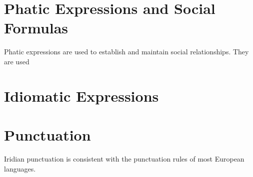 \section{Phatic Expressions and Social Formulas}

Phatic expressions are used to establish and maintain social relationships. They are used 

\section{Idiomatic Expressions}

\section{Punctuation}

Iridian punctuation is consistent with the punctuation rules of most European languages.

